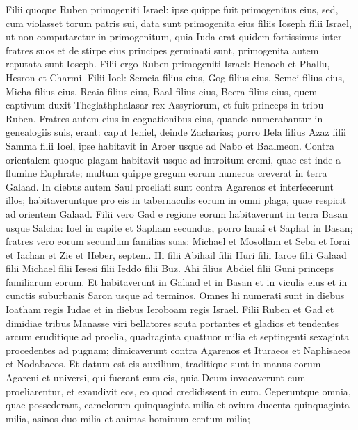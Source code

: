 \begin{biblechapter}
\begin{biblechapter}
\begin{biblechapter}
\begin{biblechapter}
\begin{biblechapter}
\verse Filii quoque Ruben primogeniti Israel: ipse quippe fuit primogenitus eius, sed, cum violasset torum patris sui, data sunt primogenita eius filiis Ioseph filii Israel, ut non computaretur in primogenitum, 
\verse quia Iuda erat quidem fortissimus inter fratres suos et de stirpe eius principes germinati sunt, primogenita autem reputata sunt Ioseph.
 \verse Filii ergo Ruben primogeniti Israel: Henoch et Phallu, Hesron et Charmi. 
\verse Filii Ioel: Semeia filius eius, Gog filius eius, Semei filius eius, 
\verse Micha filius eius, Reaia filius eius, Baal filius eius, 
\verse Beera filius eius, quem captivum duxit Theglathphalasar rex Assyriorum, et fuit princeps in tribu Ruben. 
\verse Fratres autem eius in cognationibus eius, quando numerabantur in genealogiis suis, erant: caput Iehiel, deinde Zacharias; 
\verse porro Bela filius Azaz filii Samma filii Ioel, ipse habitavit in Aroer usque ad Nabo et Baalmeon. 
 \verse Contra orientalem quoque plagam habitavit usque ad introitum eremi, quae est inde a flumine Euphrate; multum quippe gregum eorum numerus creverat in terra Galaad. 
\verse In diebus autem Saul proeliati sunt contra Agarenos et interfecerunt illos; habitaveruntque pro eis in tabernaculis eorum in omni plaga, quae respicit ad orientem Galaad.
 \verse Filii vero Gad e regione eorum habitaverunt in terra Basan usque Salcha: 
 \verse Ioel in capite et Sapham secundus, porro Ianai et Saphat in Basan; 
\verse fratres vero eorum secundum familias suas: Michael et Mosollam et Seba et Iorai et Iachan et Zie et Heber, septem. 
\verse Hi filii Abihail filii Huri filii Iaroe filii Galaad filii Michael filii Iesesi filii Ieddo filii Buz. 
\verse Ahi filius Abdiel filii Guni princeps familiarum eorum. 
\verse Et habitaverunt in Galaad et in Basan et in viculis eius et in cunctis suburbanis Saron usque ad terminos. 
\verse Omnes hi numerati sunt in diebus Ioatham regis Iudae et in diebus Ieroboam regis Israel.
 \verse Filii Ruben et Gad et dimidiae tribus Manasse viri bellatores scuta portantes et gladios et tendentes arcum eruditique ad proelia, quadraginta quattuor milia et septingenti sexaginta procedentes ad pugnam; 
\verse dimicaverunt contra Agarenos et Ituraeos et Naphisaeos et Nodabaeos. 
\verse Et datum est eis auxilium, traditique sunt in manus eorum Agareni et universi, qui fuerant cum eis, quia Deum invocaverunt cum proeliarentur, et exaudivit eos, eo quod credidissent in eum. 
\verse Ceperuntque omnia, quae possederant, camelorum quinquaginta milia et ovium ducenta quinquaginta milia, asinos duo milia et animas hominum centum milia; 

\end{biblechapter}
\end{biblechapter}
\end{biblechapter}
\end{biblechapter}
\end{biblechapter}
